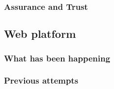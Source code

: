 


\subsubsection{Assurance and Trust}




\subsection{Web platform} 


\subsubsection{What has been happening}

\subsubsection{Previous attempts}
